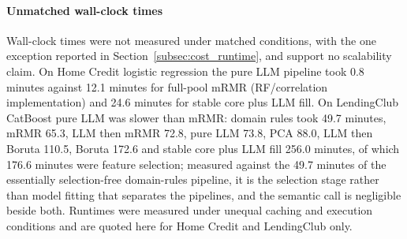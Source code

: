 \documentclass[final,5p,twocolumn]{elsarticle}
\providecommand{\DIFaddtex}[1]{{\protect\color{blue} \sf #1}} %
\providecommand{\DIFaddFL}[1]{\DIFadd{#1}} %
\providecommand{\DIFadd}[1]{\texorpdfstring{\DIFaddtex{#1}}{#1}} %
\begin{document}
\paragraph{\DIFaddFL{Unmatched wall-clock times}}
\DIFaddFL{Wall-clock times were not measured under matched conditions, with the one exception reported in Section~\ref{subsec:cost_runtime}, and support no scalability claim. On Home Credit logistic regression the pure LLM pipeline took 0.8 minutes against 12.1 minutes for full-pool mRMR (RF/correlation implementation) and 24.6 minutes for stable core plus LLM fill. On LendingClub CatBoost pure LLM was slower than mRMR: domain rules took 49.7 minutes, mRMR 65.3, LLM then mRMR 72.8, pure LLM 73.8, PCA 88.0, LLM then Boruta 110.5, Boruta 172.6 and stable core plus LLM fill 256.0 minutes, of which 176.6 minutes were feature selection; measured against the 49.7 minutes of the essentially selection-free domain-rules pipeline, it is the selection stage rather than model fitting that separates the pipelines, and the semantic call is negligible beside both. Runtimes were measured under unequal caching and execution conditions and are quoted here for Home Credit and LendingClub only.
}
\end{document}
